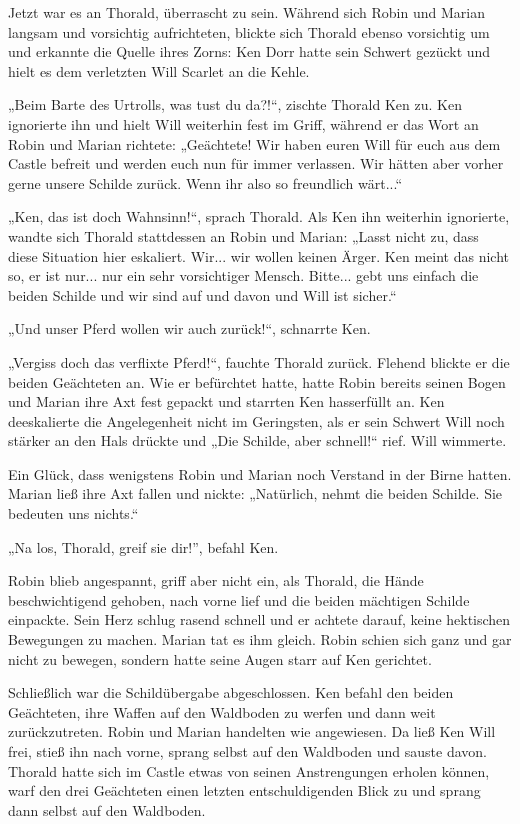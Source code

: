 \documentclass[10pt, a4paper, oneside]{book}
\begin{document}
Jetzt war es an Thorald, überrascht zu sein. Während sich Robin und Marian langsam und vorsichtig aufrichteten, blickte sich Thorald ebenso vorsichtig um und erkannte die Quelle ihres Zorns: Ken Dorr hatte sein Schwert gezückt und hielt es dem verletzten Will Scarlet an die Kehle.

„Beim Barte des Urtrolls, was tust du da?!“, zischte Thorald Ken zu. Ken ignorierte ihn und hielt Will weiterhin fest im Griff, während er das Wort an Robin und Marian richtete: „Geächtete! Wir haben euren Will für euch aus dem Castle befreit und werden euch nun für immer verlassen. Wir hätten aber vorher gerne unsere Schilde zurück. Wenn ihr also so freundlich wärt...“

„Ken, das ist doch Wahnsinn!“, sprach Thorald. Als Ken ihn weiterhin ignorierte, wandte sich Thorald stattdessen an Robin und Marian: „Lasst nicht zu, dass diese Situation hier eskaliert. Wir... wir wollen keinen Ärger. Ken meint das nicht so, er ist nur... nur ein sehr vorsichtiger Mensch. Bitte... gebt uns einfach die beiden Schilde und wir sind auf und davon und Will ist sicher.“

„Und unser Pferd wollen wir auch zurück!“, schnarrte Ken.

„Vergiss doch das verflixte Pferd!“, fauchte Thorald zurück. Flehend blickte er die beiden Geächteten an. Wie er befürchtet hatte, hatte Robin bereits seinen Bogen und Marian ihre Axt fest gepackt und starrten Ken hasserfüllt an. Ken deeskalierte die Angelegenheit nicht im Geringsten, als er sein Schwert Will noch stärker an den Hals drückte und „Die Schilde, aber schnell!“ rief. Will wimmerte.

Ein Glück, dass wenigstens Robin und Marian noch Verstand in der Birne hatten. Marian ließ ihre Axt fallen und nickte: „Natürlich, nehmt die beiden Schilde. Sie bedeuten uns nichts.“

„Na los, Thorald, greif sie dir!”, befahl Ken.

Robin blieb angespannt, griff aber nicht ein, als Thorald, die Hände beschwichtigend gehoben, nach vorne lief und die beiden mächtigen Schilde einpackte. Sein Herz schlug rasend schnell und er achtete darauf, keine hektischen Bewegungen zu machen. Marian tat es ihm gleich. Robin schien sich ganz und gar nicht zu bewegen, sondern hatte seine Augen starr auf Ken gerichtet.

Schließlich war die Schildübergabe abgeschlossen. Ken befahl den beiden Geächteten, ihre Waffen auf den Waldboden zu werfen und dann weit zurückzutreten. Robin und Marian handelten wie angewiesen. Da ließ Ken Will frei, stieß ihn nach vorne, sprang selbst auf den Waldboden und sauste davon. Thorald hatte sich im Castle etwas von seinen Anstrengungen erholen können, warf den drei Geächteten einen letzten entschuldigenden Blick zu und sprang dann selbst auf den Waldboden.
\end{document}
